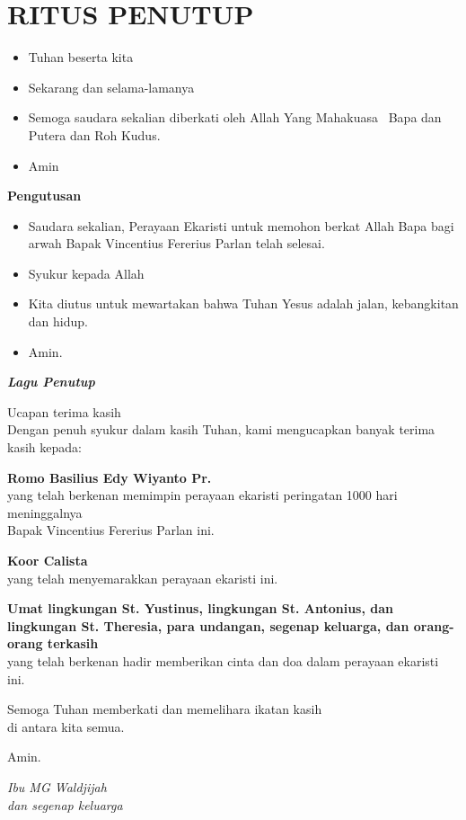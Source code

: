 \documentclass[titlepage,10pt,openany]{scrbook}
\makeatletter
\newcommand{\subjudul}[1]{%
  {\parindent \z@ 
    \interlinepenalty\@M \bfseries #1\par\nobreak \vskip 10\p@ }}
\newcommand{\lagu}[1]{%
  {\parindent \z@ 
    \interlinepenalty\@M \slshape \bfseries \normalsize \textit{#1}\par\nobreak \vskip 10\p@ }}
\newcommand{\BU}[1]{\begin{itemize} \item[U:] #1 \end{itemize}}
\newcommand{\BI}[1]{\begin{itemize} \item[I:] #1 \end{itemize}}
\newcommand{\namaalm}{Bapak Vincentius Fererius Parlan\xspace}
\newcommand{\namaromo}{Basilius Edy Wiyanto Pr.\xspace}
\makeatother
\begin{document}
\section*{RITUS PENUTUP}

\BI{Tuhan beserta kita}

\BU{Sekarang dan selama-lamanya}

\BI{Semoga saudara sekalian diberkati oleh Allah Yang 
Mahakuasa \Cross ~Bapa dan Putera dan Roh Kudus.}

\BU{Amin}

 

\subjudul{Pengutusan}

\BI{Saudara sekalian, Perayaan Ekaristi untuk memohon 
berkat Allah Bapa bagi arwah \namaalm telah selesai.}

\BU{Syukur kepada Allah}

\BI{Kita diutus untuk mewartakan bahwa Tuhan Yesus adalah 
jalan, kebangkitan dan hidup.}

\BU{Amin.}

 

\lagu{Lagu Penutup}

 

 

\newpage
\begin{flushright}
{\Large Ucapan terima kasih}\\
\noindent Dengan penuh syukur dalam kasih Tuhan, kami mengucapkan banyak
terima kasih kepada:
\large

\textbf{Romo \namaromo}\\
yang telah berkenan memimpin perayaan ekaristi peringatan 1000 hari meninggalnya\\ \namaalm
ini.

\textbf{Koor Calista}\\
yang telah menyemarakkan perayaan ekaristi ini.

\textbf{Umat lingkungan St. Yustinus, lingkungan St. Antonius, dan lingkungan St. Theresia, para undangan, segenap keluarga, dan orang-orang terkasih}\\
yang telah berkenan hadir memberikan cinta dan doa dalam perayaan
ekaristi ini.

Semoga Tuhan memberkati dan memelihara ikatan kasih\\ di antara kita semua.

Amin.

\bigskip 

\textit{Ibu MG Waldjijah\\
dan segenap keluarga}
\end{flushright}
\end{document}
